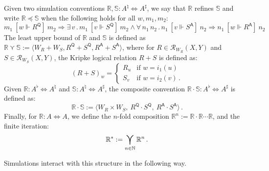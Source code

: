 \documentclass[acmsmall,timestamp,review,anonymous]{acmart}
\newcommand{\kw}[1]{\ensuremath{ \mathsf{#1} }}
\newcommand{\ifr}[1]{\ [{#1}]\ }
\begin{document}
\begin{definition} %
Given two simulation conventions
$\mathbb{R}, \mathbb{S} : A^\natural \Leftrightarrow A^\sharp$,
we say that
$\mathbb{R}$ refines $\mathbb{S}$ and write
$\mathbb{R} \preceq \mathbb{S}$
when the following holds for all $w, m_1, m_2$:
\[
      m_1 \ifr{w \Vdash R^\kw{Q}} m_2 \Rightarrow
      \exists \, v \,.\,
        m_1 \ifr{v \Vdash S^\kw{Q}} m_2 \wedge
        \forall \, n_1 \, n_2 \,.\,
          n_1 \ifr{v \Vdash S^\kw{A}} n_2 \Rightarrow
          n_1 \ifr{w \Vdash R^\kw{A}} n_2
\]
The least upper bound of $\mathbb{R}$ and $\mathbb{S}$
is defined as
$
    \mathbb{R} \curlyvee \mathbb{S} :=
      \langle
        W_R + W_S,
        R^\kw{Q} + S^\kw{Q},
        R^\kw{A} + S^\kw{A}
      \rangle
$,
where for $R \in \mathcal{R}_{W_R}(X,Y)$
and $S \in \mathcal{R}_{W_S}(X,Y)$,
the Kripke logical relation $R + S$ is defined as:
\[
    (R + S)_w =
    \begin{cases}
      R_u & \mbox{if } w = i_1(u) \\
      S_v & \mbox{if } w = i_2(v) \,.
    \end{cases}
\]
Given
$\mathbb{R} : A^\flat \Leftrightarrow A^\natural$ and
$\mathbb{S} : A^\natural \Leftrightarrow A^\sharp$,
the composite convention
$\mathbb{R} \cdot \mathbb{S} : A^\flat \Leftrightarrow A^\sharp$ is defined as:
\[
    \mathbb{R} \cdot \mathbb{S} :=
      \langle
        W_R \times W_S, \:
        R^\kw{Q} \cdot S^\kw{Q}, \:
        R^\kw{A} \cdot S^\kw{A}
      \rangle \,.
\]
Finally,
for $\mathbb{R} : A \Leftrightarrow A$,
we define the $n$-fold composition
$\mathbb{R}^n := \mathbb{R} \cdot \mathbb{R} \cdots \mathbb{R}$,
and the finite iteration:
\[
    \mathbb{R}^* :=
      \bigcurlyvee_{n \in \mathbb{N}} \mathbb{R}^n \,.
\]
\end{definition}

Simulations interact with this structure in the following way.
\end{document}
